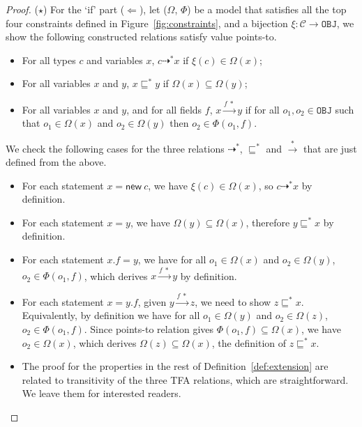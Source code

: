 \documentclass{fac}
\newcommand{\keyword}[1]{\mathsf{#1}}
\newcommand{\kwnew}[0]{\keyword{new}}
\newcommand\Obj{\mathtt{OBJ}}
\newcommand{\VPT}{\Omega}
\newcommand{\HPT}{\Phi}
\newcommand{\Class}{\mathcal{C}}
\newcommand{\less}{\sqsubseteq}
\newcommand{\tflow}{\dashrightarrow}
\newcommand{\hflow}{\longrightarrow}
\newcommand{\lhflow}[1]{\stackrel{#1}{\hflow}}
\begin{document}
\begin{proof}
\medskip

($\star$) For the `if' part ($\Leftarrow$), let ($\VPT$, $\HPT$) be a model that satisfies all the top four constraints defined in Figure~\ref{fig:constraints}, and a bijection $\xi:\Class\rightarrow\Obj$, we show the following constructed relations satisfy value points-to.
\begin{itemize}
  \item For all types $c$ and variables $x$, $c\tflow^* x$ if $\xi(c)\in\VPT(x)$;
  \item For all variables $x$ and $y$, $x\less^*y$ if $\VPT(x)\subseteq\VPT(y)$;
  \item For all variables $x$ and $y$, and for all fields $f$, $x\lhflow{f\ *}y$ if for all $o_1,o_2\in\Obj$ such that $o_1\in\VPT(x)$ and $o_2\in\VPT(y)$ then $o_2\in\HPT(o_1,f)$.
\end{itemize}
We check the following cases for the three relations $\tflow^*$, $\less^*$ and $\lhflow{*}$ that are just defined from the above.
\begin{itemize}
\item For each statement $x = \kwnew\ c$, we have $\xi(c)\in\VPT(x)$, so $c\tflow^* x$ by definition.
\item For each statement $x = y$, we have $\VPT(y)\subseteq\VPT(x)$, therefore $y\less^*x$ by definition.
\item For each statement $x.f = y$, we have for all $o_1\in\VPT(x)$ and $o_2\in\VPT(y)$, $o_2\in\HPT(o_1,f)$, which derives $x\lhflow{f\ *}y$ by definition.
\item  For each statement $x = y.f$, given $y\lhflow{f\ *}z$, we need to show $z\less^* x$. Equivalently, by definition we have for all $o_1\in\VPT(y)$ and $o_2\in\VPT(z)$, $o_2\in\HPT(o_1,f)$. Since points-to relation gives $\HPT(o_1,f)\subseteq\VPT(x)$, we have $o_2\in\VPT(x)$, which derives $\VPT(z)\subseteq\VPT(x)$, the definition of $z\less^* x$.
\item The proof for the properties in the rest of Definition~\ref{def:extension} are related to transitivity of the three TFA relations, which are straightforward. We leave them for interested readers.
\end{itemize}
\end{proof}
\end{document}
